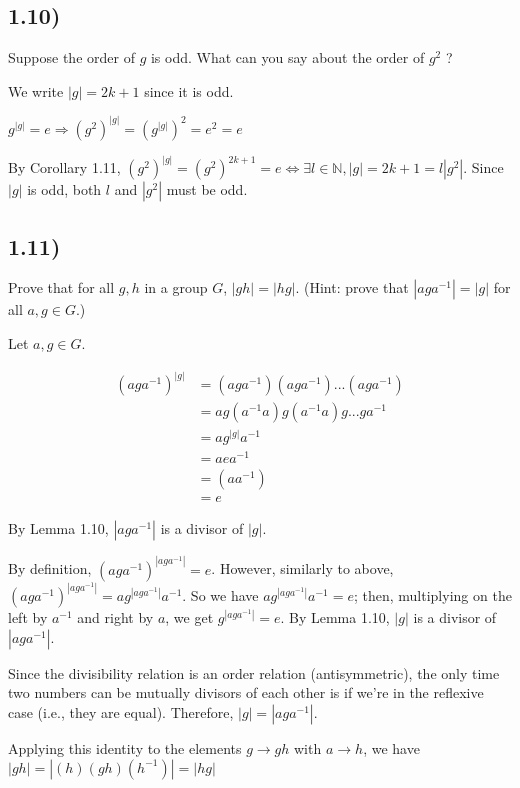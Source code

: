 \documentclass[12pt, letterpaper, twoside]{report}
\begin{document}
\subsection*{1.10)}

Suppose the order of $g$ is odd. What can you say about the order of $g^2$ ?

We write $|g| = 2k + 1$ since it is odd.

$g^{|g|} = e \Rightarrow (g^2)^{|g|} = (g^{|g|})^2 = e^2 = e$

By Corollary 1.11, $(g^2)^{|g|} = (g^2)^{2k + 1} = e \Leftrightarrow \exists l \in \mathbb{N}, |g| = 2k + 1 = l|g^2|$. Since $|g|$ is odd, both $l$ and $|g^2|$ must be odd.



\subsection*{1.11)}

Prove that for all $g, h$ in a group $G$, $|gh| = |hg|$. (Hint: prove that $|aga^{-1}| = |g|$ for all $a, g \in G$.)

Let $a, g \in G$.

$$
\begin{array}{ll}
(aga^{-1})^{|g|} &= (aga^{-1})(aga^{-1})...(aga^{-1}) \\
                 &= ag(a^{-1}a)g(a^{-1}a)g...ga^{-1} \\
                 &= ag^{|g|}a^{-1} \\
                 &= aea^{-1} \\
                 &= (aa^{-1}) \\
                 &= e
\end{array}
$$

By Lemma 1.10, $|aga^{-1}|$ is a divisor of $|g|$.

By definition, $(aga^{-1})^{|aga^{-1}|} = e$. However, similarly to above, $(aga^{-1})^{|aga^{-1}|} = ag^{|aga^{-1}|}a^{-1}$. So we have $ag^{|aga^{-1}|}a^{-1} = e$; then, multiplying on the left by $a^{-1}$ and right by $a$, we get $g^{|aga^{-1}|} = e$. By Lemma 1.10, $|g|$ is a divisor of $|aga^{-1}|$.

Since the divisibility relation is an order relation (antisymmetric), the only time two numbers can be mutually divisors of each other is if we're in the reflexive case (i.e., they are equal). Therefore, $|g| = |aga^{-1}|$.

Applying this identity to the elements $g \to gh$ with $a \to h$, we have $|gh| = |(h)(gh)(h^{-1})| = |hg|$
\end{document}
